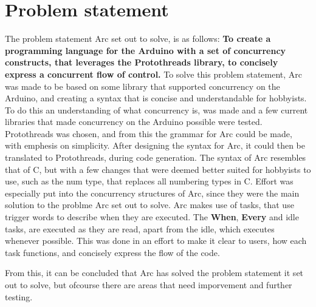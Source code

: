 \section{Problem statement}

The problem statement Arc set out to solve, is as follows: 
\textbf{To create a programming language for the Arduino with a set of concurrency constructs, that leverages the Protothreads library, to concisely express a concurrent flow of control.}
To solve this problem statement, Arc was made to be based on some library that supported concurrency on the Arduino, and creating a syntax that is concise and understandable for hobbyists. To do this an understanding of what concurrency is, was made and a few current libraries that made concurrency on the Arduino possible were tested. Protothreads was chosen, and from this the grammar for Arc could be made, with emphesis on simplicity. After designing the syntax for Arc, it could then be translated to Protothreads, during code generation. The syntax of Arc resembles that of C, but with a few changes that were deemed better suited for hobbyists to use, such as the num type, that replaces all numbering types in C. Effort was especially put into the concurrency structures of Arc, since they were the main solution to the problme Arc set out to solve. Arc makes use of tasks, that use trigger words to describe when they are executed. The \textbf{When}, \textbf{Every} and idle tasks, are executed as they are read, apart from the idle, which executes whenever possible. This was done in an effort to make it clear to users, how each task functions, and concisely express the flow of the code. 

From this, it can be concluded that Arc has solved the problem statement it set out to solve, but ofcourse there are areas that need imporvement and further testing.


